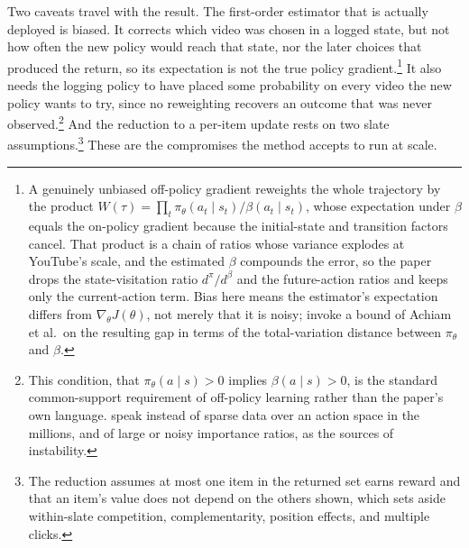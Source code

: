 Two caveats travel with the result. The first-order estimator that is actually deployed is biased. It corrects which video was chosen in a logged state, but not how often the new policy would reach that state, nor the later choices that produced the return, so its expectation is not the true policy gradient.\footnote{A genuinely unbiased off-policy gradient reweights the whole trajectory by the product $W(\tau) = \prod_t \pi_\theta(a_t \mid s_t) / \beta(a_t \mid s_t)$, whose expectation under $\beta$ equals the on-policy gradient because the initial-state and transition factors cancel. That product is a chain of ratios whose variance explodes at YouTube's scale, and the estimated $\beta$ compounds the error, so the paper drops the state-visitation ratio $d^\pi/d^\beta$ and the future-action ratios and keeps only the current-action term. Bias here means the estimator's expectation differs from $\nabla_\theta J(\theta)$, not merely that it is noisy; \citet{Chen2019YouTubeTopK} invoke a bound of Achiam et al.\ on the resulting gap in terms of the total-variation distance between $\pi_\theta$ and $\beta$.} It also needs the logging policy to have placed some probability on every video the new policy wants to try, since no reweighting recovers an outcome that was never observed.\footnote{This condition, that $\pi_\theta(a \mid s) > 0$ implies $\beta(a \mid s) > 0$, is the standard common-support requirement of off-policy learning rather than the paper's own language. \citet{Chen2019YouTubeTopK} speak instead of sparse data over an action space in the millions, and of large or noisy importance ratios, as the sources of instability.} And the reduction to a per-item update rests on two slate assumptions.\footnote{The reduction assumes at most one item in the returned set earns reward and that an item's value does not depend on the others shown, which sets aside within-slate competition, complementarity, position effects, and multiple clicks.} These are the compromises the method accepts to run at scale.

